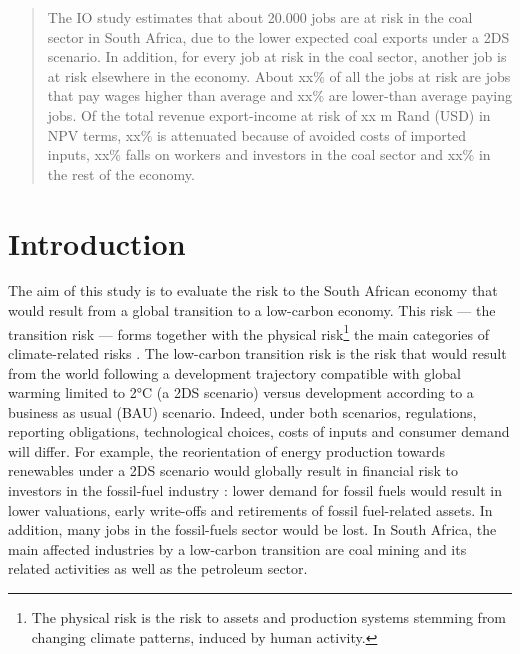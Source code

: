 \documentclass[12pt,english]{article}
\begin{document}
\begin{abstract}
The IO study estimates that about 20.000 jobs are at risk in the coal sector in South Africa, due to %
the lower expected coal exports under a 2DS scenario. In addition, for every job at risk in the coal sector, another job is at risk elsewhere in the economy. About xx\% of all the jobs at risk are jobs that pay wages higher than average and xx\% are lower-than average paying jobs. Of the total revenue export-income at risk of xx m Rand (USD) in NPV terms, xx\% is attenuated because of avoided costs of imported inputs, xx\% falls on workers and investors in the coal sector and xx\% in the rest of the economy.


\end{abstract}

\section{Introduction}

The aim of this study is to evaluate %
the risk to the South African economy that would result from a global transition to a low-carbon economy. This risk --- the transition risk --- forms together with the physical risk\footnote{The physical risk is the risk to assets and production systems stemming from changing climate patterns, induced by human activity.} the main categories of climate-related risks %
\citep{board2017recommendations}. The low-carbon transition risk is the risk that would result from the world following a development trajectory compatible with global warming limited to 2°C (a 2DS scenario) versus development according to a business as usual (BAU) scenario. Indeed, under both scenarios, regulations, reporting obligations, technological choices, costs of inputs and consumer demand will differ. For example, the reorientation of energy production towards renewables under a 2DS scenario would globally result in financial risk to investors in the fossil-fuel industry : lower demand for fossil fuels would result in lower valuations, early write-offs and retirements of fossil fuel-related assets. In addition, many jobs in the fossil-fuels sector would be lost. In South Africa, the main affected industries by a low-carbon transition are coal mining and its related activities as well as the petroleum sector.
\end{document}
